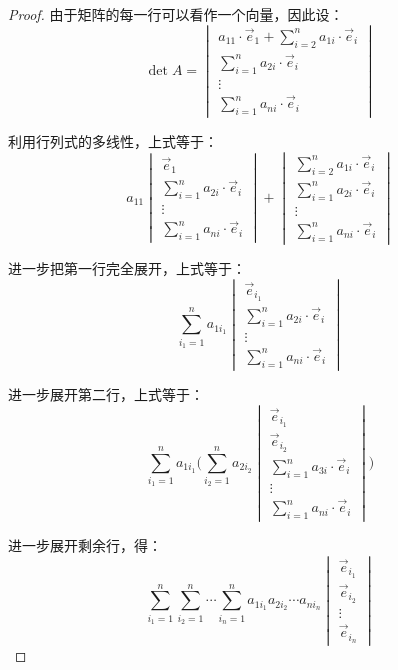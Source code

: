 \begin{proof}
	由于矩阵的每一行可以看作一个向量，因此设：
	$$
	\det A =
	\begin{vmatrix}
		a_{11} \cdot \vec e_1 + \sum\limits_{i = 2}^n a_{1i} \cdot \vec e_i
		\\
		\sum\limits_{i = 1}^n a_{2i} \cdot \vec e_i
		\\
		\vdots
		\\
		\sum\limits_{i = 1}^n a_{ni} \cdot \vec e_i
	\end{vmatrix}
	$$

	利用行列式的多线性，上式等于：
	$$
	a_{11} \begin{vmatrix} \vec e_1 \\ \sum\limits_{i = 1}^n a_{2i} \cdot \vec e_i \\ \vdots \\ \sum\limits_{i = 1}^n a_{ni} \cdot \vec e_i \end{vmatrix} + \begin{vmatrix} \sum\limits_{i = 2}^n a_{1i} \cdot \vec e_i \\ \sum\limits_{i = 1}^n a_{2i} \cdot \vec e_i \\ \vdots \\ \sum\limits_{i = 1}^n a_{ni} \cdot \vec e_i \end{vmatrix}
	$$

	进一步把第一行完全展开，上式等于：
	$$
	\sum\limits_{i_1 = 1}^n a_{1 i_1} \begin{vmatrix} \vec e_{i_1} \\ \sum\limits_{i = 1}^n a_{2i} \cdot \vec e_i \\ \vdots \\ \sum\limits_{i = 1}^n a_{ni} \cdot \vec e_i \end{vmatrix}
	$$

	进一步展开第二行，上式等于：
	$$
	\sum\limits_{i_1 = 1}^n a_{1 i_1} \Biggl( \sum\limits_{i_2 = 1}^n a_{2 i_2} \begin{vmatrix} \vec e_{i_1} \\ \vec e_{i_2} \\ \sum\limits_{i = 1}^n a_{3i} \cdot \vec e_i \\ \vdots \\ \sum\limits_{i = 1}^n a_{ni} \cdot \vec e_i \end{vmatrix} \Biggr)
	$$

	进一步展开剩余行，得：
	$$
	\sum\limits_{i_1 = 1}^n \sum\limits_{i_2 = 1}^n \cdots \sum\limits_{i_n = 1}^n a_{1 i_1} a_{2 i_2} \cdots a_{n i_n} \begin{vmatrix} \vec e_{i_1} \\ \vec e_{i_2} \\ \vdots \\ \vec e_{i_n} \end{vmatrix}
	$$


\end{proof}
